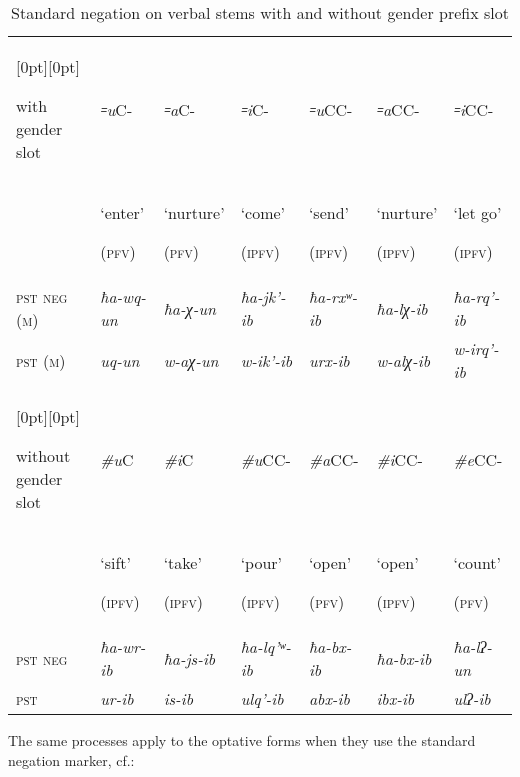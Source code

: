 \documentclass[output=paper]{langsci/langscibook}
\begin{document}
\begin{table}[H]
  \captionsetup{margin=0pt}
\caption{Standard negation on verbal stems with and without gender prefix slot}

\small
\begin{tabular}{@{}l*6{m{}<{\raggedright}}@{}}
\toprule
\raisebox{-14pt}[0pt][0pt]{\parbox{.1\textwidth}{\raggedright with gender slot}} & \emph{꞊u}C- & \emph{꞊a}C- & \emph{꞊i}C- & \emph{꞊u}CC- & \emph{꞊a}CC- & \emph{꞊i}CC-\tabularnewline \cmidrule{2-7}
& `enter'

(\textsc{pfv}) & 
`nurture'

(\textsc{pfv}) & 
`come'

(\textsc{ipfv}) & 
`send'

(\textsc{ipfv}) & 
`nurture'

(\textsc{ipfv}) & 
`let go'

(\textsc{ipfv})\tabularnewline \midrule
\textsc{pst} \textsc{neg} (\textsc{m}) & \emph{ħa-wq-un} & \emph{ħa-χ-un} & \emph{ħa-jk'-ib} &
\emph{ħa-rxʷ-ib} & \emph{ħa-lχ-ib} & \emph{ħa-rq'-ib}\tabularnewline
\textsc{pst} (\textsc{m}) & \emph{uq-un} & \emph{w-aχ-un} & \emph{w-ik'-ib} &
\emph{urx-ib} & \emph{w-alχ-ib} & \emph{w-irq'-ib}\tabularnewline \midrule 
\raisebox{-14pt}[0pt][0pt]{\parbox{.1\textwidth}{\raggedright without gender slot}}
  & \emph{\#u}C & \emph{\#i}C & \emph{\#u}CC- & \emph{\#a}CC- &
\emph{\#i}CC- & \emph{\#e}CC-\tabularnewline \cmidrule{2-7}
& 
`sift'

(\textsc{ipfv}) & 
`take'

(\textsc{ipfv}) & 
`pour'

(\textsc{ipfv}) & 
`open'

(\textsc{pfv}) & 
`open'

(\textsc{ipfv}) & 
`count'

(\textsc{pfv})\tabularnewline \midrule
\textsc{pst} \textsc{neg} & \emph{ħa-wr-ib} & \emph{ħa-js-ib} & \emph{ħa-lq'ʷ-ib} &
\emph{ħa-bx-ib} & \emph{ħa-bx-ib} & \emph{ħa-lʔ-un}\tabularnewline
\textsc{pst} & \emph{ur-ib} & \emph{is-ib} & \emph{ulq'-ib} & \emph{abx-ib} &
\emph{ibx-ib} & \emph{ulʔ-ib}\tabularnewline
\bottomrule
\end{tabular}
\end{table}

The same processes apply to the optative forms when they use the
standard negation marker, cf.:
\end{document}
